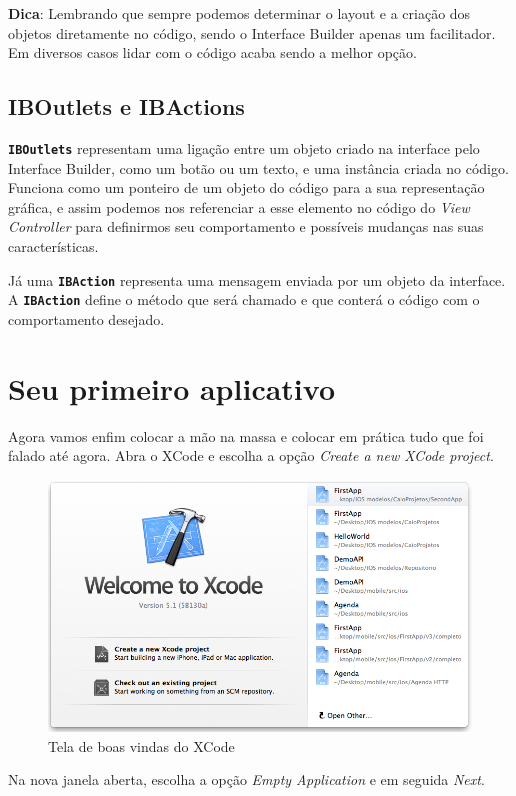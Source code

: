 \documentclass[a4paper,12pt,brazil,doubleside]{book}
\begin{document}
\begin{singlespace}
\begin{framed}
\textbf{Dica}:  Lembrando que sempre podemos determinar o layout e a criação dos objetos diretamente no código, sendo o Interface Builder apenas um facilitador. Em diversos casos lidar com o código acaba sendo a melhor opção.
\end{framed}

\subsection{IBOutlets e IBActions}

\texttt{\textbf{IBOutlets}} representam uma ligação entre um objeto criado na interface pelo Interface Builder, como um botão ou um texto, e uma instância criada no código. Funciona como um ponteiro de um objeto do código para a sua representação gráfica, e assim podemos nos referenciar a esse elemento no código do \emph{View Controller} para definirmos seu comportamento e possíveis mudanças nas suas características.

Já uma \texttt{\textbf{IBAction}} representa uma mensagem enviada por um objeto da interface. A \texttt{\textbf{IBAction}} define o método que será chamado e que conterá o código com o comportamento desejado.

\section{Seu primeiro aplicativo}


Agora vamos enfim colocar a mão na massa e colocar em prática tudo que foi falado até agora. Abra o XCode e escolha a opção \emph{Create a new XCode project}.

\begin{figure}[H]
  \centering
  \includegraphics[width=.75\textwidth]{figuras/3/tela_boas_vindas_xcode.png}
  \caption{Tela de boas vindas do XCode}
  \label{fig:a}
\end{figure}

Na nova janela aberta, escolha a opção \emph{Empty Application} e em seguida \emph{Next}.


\end{singlespace}
\end{document}
